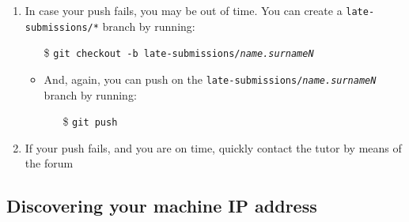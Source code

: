 \documentclass[handout]{beamer}\mode<presentation>{\usetheme{AMSCesenaBleu}}
\begin{document}
\begin{frame}[allowframebreaks]
\begin{enumerate}
        \item In case your push fails, you may be out of time. You can create a \texttt{late-submissions/*} branch by running:
        \begin{itemize}
            \item[\$] \texttt{git checkout -b late-submissions/\textit{\alert{name.surnameN}}}
            
            \vspace{.3cm}
            
            \item And, again, you can push on the \texttt{late-submissions/\textit{\alert{name.surnameN}}} branch by running:
            \begin{itemize}
                \item[\$] \texttt{git \alert{push}}
            \end{itemize}
        \end{itemize}
        
        \item If your push fails, and you are on time, quickly contact the tutor by means of the forum
            
    \end{enumerate}

\end{frame}

\subsection{Discovering your machine IP address}
\end{document}
